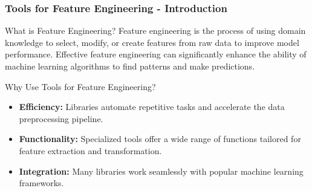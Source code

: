 \documentclass[aspectratio=169]{beamer}
\begin{document}
\begin{frame}[fragile]
    \frametitle{Tools for Feature Engineering - Introduction}
    \begin{block}{What is Feature Engineering?}
        Feature engineering is the process of using domain knowledge to select, modify, or create features from raw data to improve model performance.
        Effective feature engineering can significantly enhance the ability of machine learning algorithms to find patterns and make predictions.
    \end{block}
    
    \begin{block}{Why Use Tools for Feature Engineering?}
        \begin{itemize}
            \item \textbf{Efficiency:} Libraries automate repetitive tasks and accelerate the data preprocessing pipeline.
            \item \textbf{Functionality:} Specialized tools offer a wide range of functions tailored for feature extraction and transformation.
            \item \textbf{Integration:} Many libraries work seamlessly with popular machine learning frameworks.
        \end{itemize}
    \end{block}
\end{frame}
\end{document}
